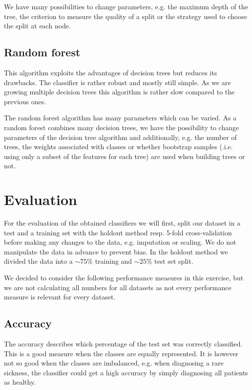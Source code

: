\documentclass[a4paper,11pt]{article}
\begin{document}
        We have many possibilities to change parameters, e.g. the maximum depth of the tree, the criterion to measure the quality of a split or the strategy used to choose the split at each node.
    
    \subsection*{Random forest} \label{subsec:random-forest}
        This algorithm exploits the advantages of decision trees but reduces its drawbacks. The classifier is rather robust and mostly still simple. As we are growing multiple decision trees this algorithm is rather slow compared to the previous ones. 
        
        The random forest algorithm has many parameters which can be varied. As a random forest combines many decision trees, we have the possibility to change parameters of the decision tree algorithm and additionally, e.g. the number of trees, the weights associated with classes or whether bootstrap samples (.i.e. using only a subset of the features for each tree) are used when building trees or not. 

\section{Evaluation} 
    For the evaluation of the obtained classifiers we will first, split our dataset in a test and a training set with the holdout method resp. 5-fold cross-validation before making any changes to the data, e.g. imputation or scaling. We do not manipulate the data in advance to prevent bias. In the holdout method we divided the data into a $\sim 75\%$ training and $\sim 25\%$ test set split.
    
    We decided to consider the following performance measures in this exercise, but we are not calculating all numbers for all datasets as not every performance measure is relevant for every dataset.
    
    \subsection{Accuracy}
        The accuracy describes which percentage of the test set was correctly classified. %
        This is a good measure when the classes are equally represented. It is however not so good when the classes are imbalanced, e.g. when diagnosing a rare sickness, the classifier could get a high accuracy by simply diagnosing all patients as healthy.
        
\end{document}
